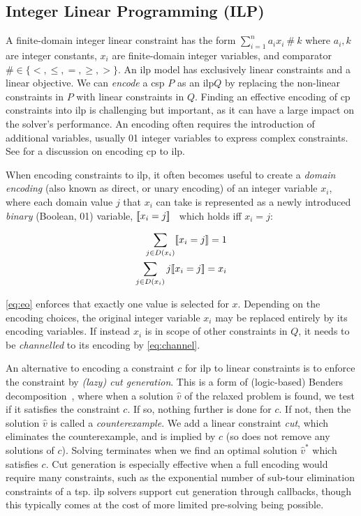 \documentclass[a4paper,UKenglish,cleveref,autoref,thm-restate]{lipics-v2021}
\newcommand{\milp}{\gls{ilp}\xspace}
\begin{document}
\subsection{Integer Linear Programming (ILP)}
\label{sec:background:ilp}

A finite-domain integer linear constraint has the form $\sum_{i=1}^n a_{i} x_{i}\ \#\ k$ where $a_{i}, k$ are integer constants, $x_{i}$ are finite-domain integer variables, and comparator $\# \in \{ <, \leq, =, \geq, > \}$.
An \milp model has exclusively linear constraints and a linear objective.
We can \textit{encode} a \gls{csp} $P$ as an \milp $Q$ by replacing the non-linear constraints in $P$ with linear constraints in $Q$. 
Finding an effective encoding of \gls{cp} constraints into \milp{} is challenging but important, as it can have a large impact on the solver's performance.
An encoding often requires the introduction of additional variables, usually 01 integer variables to express complex constraints.
See  for a discussion on encoding \gls{cp} to \milp. 

When encoding constraints to \milp, it often becomes useful to create a \textit{domain encoding} (also known as direct, or unary encoding) of an integer variable $x_i$, where each domain value $j$ that $x_i$ can take is represented as a newly introduced \textit{binary} (Boolean, 01) variable, $[\![x_i = j]\!]$~\cite{refalo_linear_2000} which holds iff $x_i = j$:

\begin{subequations}
    \label{eq:domain}
    \begin{align}
        \sum_{j \in D(x_i)} [\![x_i = j]\!] = 1 \label{eq:eo} \\
        \sum_{j \in D(x_i)} j [\![x_i = j]\!] = x_i \label{eq:channel} 
    \end{align}
\end{subequations}

\cref{eq:eo} enforces that exactly one value is selected for $x$.
Depending on the encoding choices, the original integer variable $x_i$ may be replaced entirely by its encoding variables.
If instead $x_i$ is in scope of other constraints in $Q$, it needs to be \textit{channelled} to its encoding by \cref{eq:channel}.


An alternative to encoding a constraint $c$ for \milp{} to linear constraints is to enforce the constraint by \emph{(lazy) cut generation}. 
This is a form of (logic-based) Benders decomposition~\cite{DBLP:journals/ior/Hooker07}, where when a solution $\hat{v}$ of the relaxed problem is found, 
we test if it satisfies the constraint $c$.
If so, nothing further is done for $c$.
If not, then the solution $\hat{v}$ is called a \textit{counterexample}.
We add a linear constraint \emph{cut}, which eliminates the counterexample, and is implied by $c$ (so does not remove any solutions of $c$). 
Solving terminates when we find an optimal solution $\hat{v}^{*}$ which satisfies $c$.
Cut generation is especially effective when a full encoding would require many constraints, such as the exponential number of sub-tour elimination constraints of a \gls{tsp}.
\milp{} solvers support cut generation through callbacks, though this typically comes at the cost of more limited pre-solving being possible. 
\end{document}
